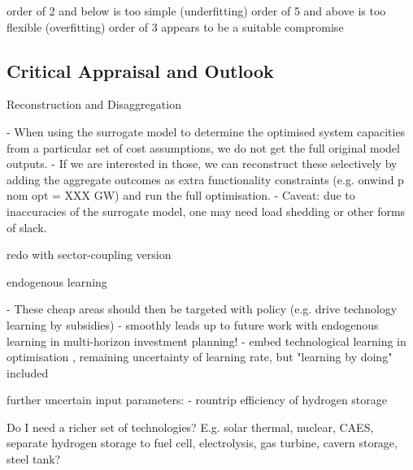
order of 2 and below is too simple (underfitting)
order of 5 and above is too flexible (overfitting)
order of 3 appears to be a suitable compromise

\subsection{Critical Appraisal and Outlook}

Reconstruction and Disaggregation

- When using the surrogate model to determine the optimised system capacities
from a particular set of cost assumptions, we do not get the full original model outputs.
- If we are interested in those, we can reconstruct these selectively
by adding the aggregate outcomes as extra  functionality constraints (e.g. onwind p nom opt = XXX GW) and run the full optimisation.
- Caveat: due to inaccuracies  of the surrogate model, one may need load shedding or other forms of slack.

redo with sector-coupling version

endogenous learning

- These cheap areas should then be targeted with policy (e.g. drive technology learning by subsidies)
- smoothly leads up to future work with endogenous learning in multi-horizon investment planning!
- embed technological learning in optimisation \cite{heuberger_power_2017} \cite{lopion_cost_2019}, remaining uncertainty of learning rate, but "learning by doing" included

further uncertain input parameters:
- rountrip efficiency of hydrogen storage

Do I need a richer set of technologies? E.g.
solar thermal, nuclear, CAES, separate hydrogen storage to fuel cell, electrolysis, gas turbine, cavern storage, steel tank?
